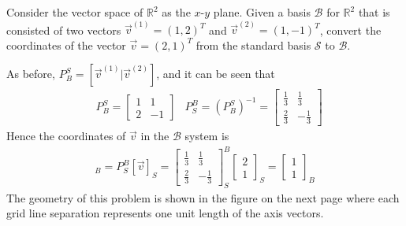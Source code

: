 \begin{exmp}
\label{exmp:2Dtransform}
Consider the vector space of $\mathbb{R}^2$ as the $x$-$y$ plane. Given a basis $\mathcal{B}$ for $\mathbb{R}^2$ that is consisted of two vectors $\vec{v}^{(1)} = (1,2)^T$ and $\vec{v}^{(2)} = (1,-1)^T$, convert the coordinates of the vector $\vec{v} = (2,1)^T$ from the standard basis $\mathcal{S}$ to $\mathcal{B}$.
\end{exmp}
\begin{solution}
As before, $P_B^S = [\vec{v}^{(1)}|\vec{v}^{(2)}]$, and it can be seen that
\begin{align*}
&P_B^S =
\begin{bmatrix}
1 & 1 \\
2 & -1
\end{bmatrix}
&P_S^B = (P_B^S)^{-1} =
\begin{bmatrix}
\frac{1}{3} & \frac{1}{3} \\
\frac{2}{3} & -\frac{1}{3}
\end{bmatrix}
\end{align*}
Hence the coordinates of $\vec{v}$ in the $\mathcal{B}$ system is
\begin{align*}
[\vec{v}]_B = P_S^B[\vec{v}]_S = 
\begin{bmatrix}
\frac{1}{3} & \frac{1}{3} \\
\frac{2}{3} & -\frac{1}{3}
\end{bmatrix}_S^B
\begin{bmatrix}
2 \\
1
\end{bmatrix}_S
=
\begin{bmatrix}
1\\
1
\end{bmatrix}_B
\end{align*}
The geometry of this problem is shown in the figure on the next page where each grid line separation represents one unit length of the axis vectors.
\begin{figure}
\centering
{}
\end{figure}
\end{solution}
